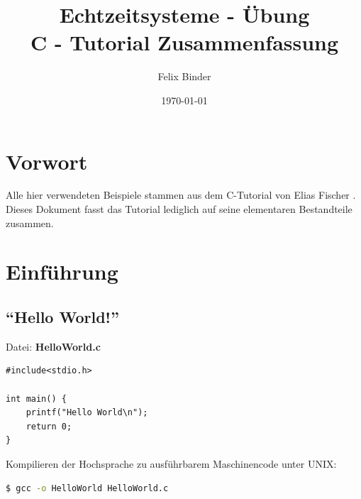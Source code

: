 \documentclass[11pt,a4paper,ngerman, fleqn]{article}
\date{\today}
\author{Felix Binder}
\title{\textbf{Echtzeitsysteme - Übung} \vspace{10mm} \\ \LARGE C - Tutorial Zusammenfassung}
\let\qt\enquote
\let\noi\noindent
\let\tbf\textbf
\begin{document}
\renewcommand{\theequation}{\arabic{section}.\arabic{equation}}
\maketitle

\thispagestyle{empty}

\newpage
{}
\setcounter{page}{1}

\tableofcontents

\newpage
{}
\setcounter{page}{1}
 
\section*{Vorwort}

Alle hier verwendeten Beispiele stammen aus dem C-Tutorial von Elias Fischer \cite{1}. Dieses Dokument fasst das Tutorial lediglich auf seine elementaren Bestandteile zusammen.

\newpage

\section{Einführung}
\subsection{\qt{Hello World!}}
\label{sec:11}


Datei: \tbf{HelloWorld.c}

\begin{lstlisting}
#include<stdio.h>

int main() {
	printf("Hello World\n");
	return 0;
}
\end{lstlisting}

\noi Kompilieren der Hochsprache zu ausführbarem Maschinencode unter UNIX:

\begin{lstlisting}[language=bash,  backgroundcolor=\color{pureblack}, basicstyle=\ttfamily\footnotesize\color{purewhite}, rulecolor=\color{slightgray}]
  $ gcc -o HelloWorld HelloWorld.c
\end{lstlisting}
\end{document}
